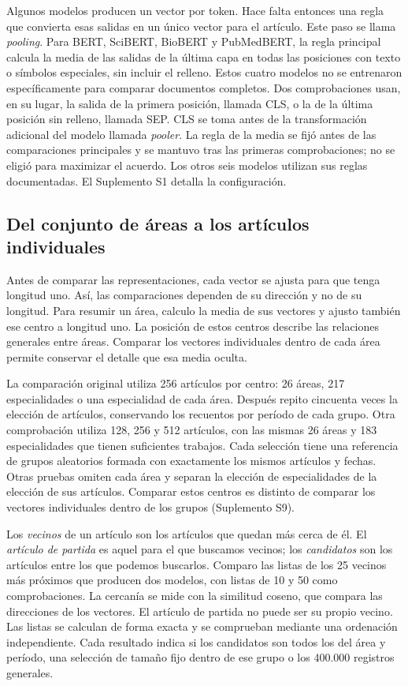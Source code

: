 \documentclass[12pt]{article}
\begin{document}
Algunos modelos producen un vector por token. Hace falta entonces una regla que convierta esas salidas en un único vector para el artículo. Este paso se llama \emph{pooling}. Para BERT, SciBERT, BioBERT y PubMedBERT, la regla principal calcula la media de las salidas de la última capa en todas las posiciones con texto o símbolos especiales, sin incluir el relleno. Estos cuatro modelos no se entrenaron específicamente para comparar documentos completos. Dos comprobaciones usan, en su lugar, la salida de la primera posición, llamada CLS, o la de la última posición sin relleno, llamada SEP. CLS se toma antes de la transformación adicional del modelo llamada \emph{pooler}. La regla de la media se fijó antes de las comparaciones principales y se mantuvo tras las primeras comprobaciones; no se eligió para maximizar el acuerdo. Los otros seis modelos utilizan sus reglas documentadas. El Suplemento S1 detalla la configuración.


\subsection{Del conjunto de áreas a los artículos individuales}
Antes de comparar las representaciones, cada vector se ajusta para que tenga longitud uno. Así, las comparaciones dependen de su dirección y no de su longitud. Para resumir un área, calculo la media de sus vectores y ajusto también ese centro a longitud uno. La posición de estos centros describe las relaciones generales entre áreas. Comparar los vectores individuales dentro de cada área permite conservar el detalle que esa media oculta.

La comparación original utiliza 256 artículos por centro: 26 áreas, 217 especialidades o una especialidad de cada área. Después repito cincuenta veces la elección de artículos, conservando los recuentos por período de cada grupo. Otra comprobación utiliza 128, 256 y 512 artículos, con las mismas 26 áreas y 183 especialidades que tienen suficientes trabajos. Cada selección tiene una referencia de grupos aleatorios formada con exactamente los mismos artículos y fechas. Otras pruebas omiten cada área y separan la elección de especialidades de la elección de sus artículos. Comparar estos centros es distinto de comparar los vectores individuales dentro de los grupos (Suplemento S9).

Los \emph{vecinos} de un artículo son los artículos que quedan más cerca de él. El \emph{artículo de partida} es aquel para el que buscamos vecinos; los \emph{candidatos} son los artículos entre los que podemos buscarlos. Comparo las listas de los 25 vecinos más próximos que producen dos modelos, con listas de 10 y 50 como comprobaciones. La cercanía se mide con la similitud coseno, que compara las direcciones de los vectores. El artículo de partida no puede ser su propio vecino. Las listas se calculan de forma exacta y se comprueban mediante una ordenación independiente. Cada resultado indica si los candidatos son todos los del área y período, una selección de tamaño fijo dentro de ese grupo o los 400.000 registros generales.
\end{document}
